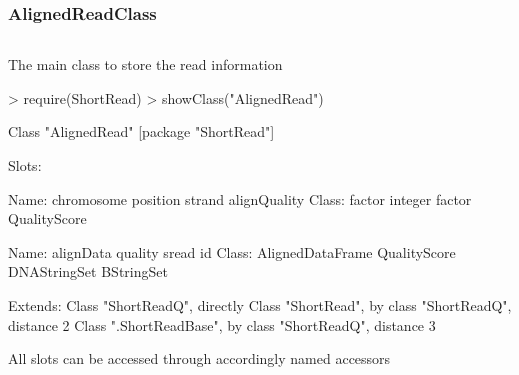 \documentclass{beamer}
\begin{document}
\begin{frame}[fragile]
\frametitle{AlignedReadClass}
\begin{column}{1\textwidth}
  \bit
      \item   The main class to store the read information
                     \begin{uncoverenv}
\begin{Schunk}
\begin{Sinput}
> require(ShortRead)
> showClass("AlignedRead")
\end{Sinput}
\begin{Soutput}
Class "AlignedRead" [package "ShortRead"]

Slots:
                                                                          
Name:        chromosome         position           strand     alignQuality
Class:           factor          integer           factor     QualityScore
                                                                          
Name:         alignData          quality            sread               id
Class: AlignedDataFrame     QualityScore     DNAStringSet       BStringSet

Extends: 
Class "ShortReadQ", directly
Class "ShortRead", by class "ShortReadQ", distance 2
Class ".ShortReadBase", by class "ShortReadQ", distance 3
\end{Soutput}
\end{Schunk}
                        \end{uncoverenv}  
      \item All slots can be accessed through accordingly named accessors
  \eit
  \end{column}
\end{frame}

\end{document}
